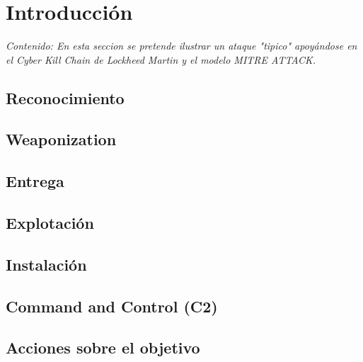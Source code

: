 \chapter{Introducción}

\textit{Contenido: En esta seccion se pretende ilustrar un ataque "tipico"
apoyándose en el Cyber Kill Chain de Lockheed Martin y el modelo MITRE ATTACK.}
\vspace{1em}

\section{Reconocimiento}

\section{Weaponization}

\section{Entrega}

\section{Explotación}

\section{Instalación}

\section{Command and Control (C2)}

\section{Acciones sobre el objetivo}